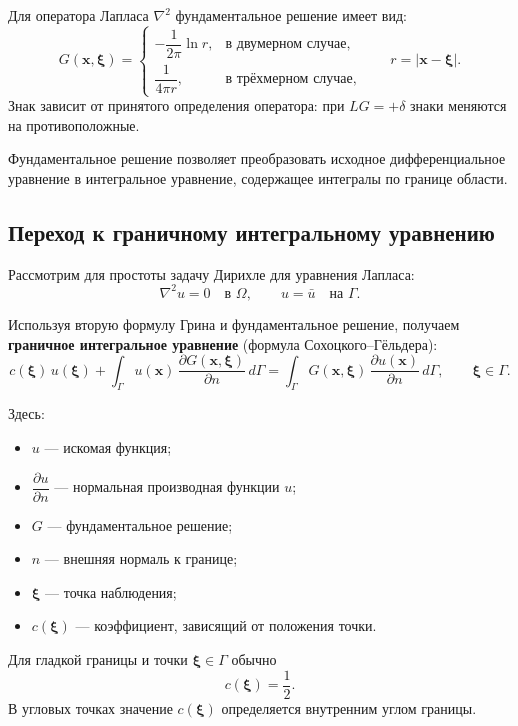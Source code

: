 Для оператора Лапласа $\nabla^2$ фундаментальное решение имеет вид:
$$
G(\mathbf{x},\boldsymbol{\xi}) =
\begin{cases}
	-\dfrac{1}{2\pi}\ln r, & \text{в двумерном случае},\\[2mm]
	\dfrac{1}{4\pi r}, & \text{в трёхмерном случае},
\end{cases}
\qquad
r = |\mathbf{x}-\boldsymbol{\xi}|.
$$
Знак зависит от принятого определения оператора: при $L G = +\delta$ знаки меняются на противоположные.

Фундаментальное решение позволяет преобразовать исходное дифференциальное уравнение в интегральное уравнение, содержащее интегралы по границе области.

\subsection{Переход к граничному интегральному уравнению}

Рассмотрим для простоты задачу Дирихле для уравнения Лапласа:
$$
\nabla^2 u = 0 \quad \text{в } \Omega, \qquad
u = \bar u \quad \text{на } \Gamma.
$$

Используя вторую формулу Грина и фундаментальное решение, получаем \textbf{граничное интегральное уравнение} (формула Сохоцкого--Гёльдера):
$$
c(\boldsymbol{\xi})\,u(\boldsymbol{\xi})
+
\int_{\Gamma} u(\mathbf{x})\,
\frac{\partial G(\mathbf{x},\boldsymbol{\xi})}{\partial n}
\,d\Gamma
=
\int_{\Gamma} G(\mathbf{x},\boldsymbol{\xi})\,
\frac{\partial u(\mathbf{x})}{\partial n}
\,d\Gamma,
\qquad \boldsymbol{\xi}\in\Gamma.
$$

Здесь:
\begin{itemize}
	\item $u$ --- искомая функция;
	\item $\dfrac{\partial u}{\partial n}$ --- нормальная производная функции $u$;
	\item $G$ --- фундаментальное решение;
	\item $n$ --- внешняя нормаль к границе;
	\item $\boldsymbol{\xi}$ --- точка наблюдения;
	\item $c(\boldsymbol{\xi})$ --- коэффициент, зависящий от положения точки.
\end{itemize}

Для гладкой границы и точки $\boldsymbol{\xi}\in\Gamma$ обычно
$$
c(\boldsymbol{\xi}) = \frac{1}{2}.
$$
В угловых точках значение $c(\boldsymbol{\xi})$ определяется внутренним углом границы.

